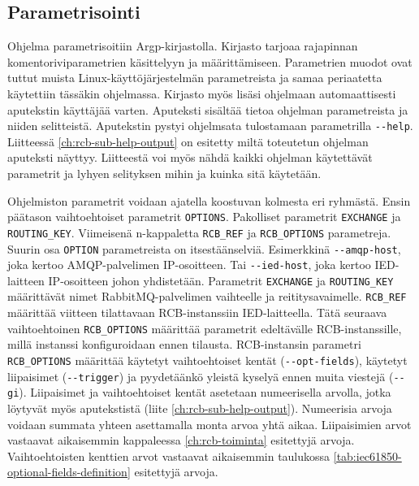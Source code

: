 \subsection{Parametrisointi}
Ohjelma parametrisoitiin Argp-kirjastolla. Kirjasto tarjoaa rajapinnan komentoriviparametrien käsittelyyn ja määrittämiseen. Parametrien muodot ovat tuttut muista Linux-käyttöjärjestelmän parametreista ja samaa periaatetta käytettiin tässäkin ohjelmassa. Kirjasto myös lisäsi ohjelmaan automaattisesti aputekstin käyttäjää varten. Aputeksti sisältää tietoa ohjelman parametreista ja niiden selitteistä. Aputekstin pystyi ohjelmsata tulostamaan parametrilla \texttt{-{}-help}. Liitteessä \ref{ch:rcb-sub-help-output} on esitetty miltä toteutetun ohjelman aputeksti näyttyy. Liitteestä voi myös nähdä kaikki ohjelman käytettävät parametrit ja lyhyen selityksen mihin ja kuinka sitä käytetään.

Ohjelmiston parametrit voidaan ajatella koostuvan kolmesta eri ryhmästä. Ensin päätason vaihtoehtoiset parametrit \texttt{OPTIONS}. Pakolliset parametrit \texttt{EXCHANGE} ja \texttt{ROUTING\_KEY}. Viimeisenä n-kappaletta \texttt{RCB\_REF} ja \texttt{RCB\_OPTIONS} parametreja. Suurin osa \texttt{OPTION} parametreista on itsestäänselviä. Esimerkkinä \texttt{-{}-amqp-host}, joka kertoo AMQP-palvelimen IP-osoitteen. Tai \texttt{-{}-ied-host}, joka kertoo IED-laitteen IP-osoitteen johon yhdistetään. Parametrit \texttt{EXCHANGE} ja \texttt{ROUTING\_KEY} määrittävät nimet RabbitMQ-palvelimen vaihteelle ja reititysavaimelle. \texttt{RCB\_REF} määrittää viitteen tilattavaan RCB-instanssiin IED-laitteella. Tätä seuraava vaihtoehtoinen \texttt{RCB\_OPTIONS} määrittää parametrit edeltävälle RCB-instanssille, millä instanssi konfiguroidaan ennen tilausta. RCB-instansin parametri \texttt{RCB\_OPTIONS} määrittää käytetyt vaihtoehtoiset kentät (\texttt{-{}-opt-fields}), käytetyt liipaisimet (\texttt{-{}-trigger}) ja pyydetäänkö yleistä kyselyä ennen muita viestejä (\texttt{-{}-gi}). Liipaisimet ja vaihtoehtoiset kentät asetetaan numeerisella arvolla, jotka löytyvät myös aputekstistä (liite \ref{ch:rcb-sub-help-output}). Numeerisia arvoja voidaan summata yhteen asettamalla monta arvoa yhtä aikaa. Liipaisimien arvot vastaavat aikaisemmin kappaleessa \ref{ch:rcb-toiminta} esitettyjä arvoja. Vaihtoehtoisten kenttien arvot vastaavat aikaisemmin taulukossa \ref{tab:iec61850-optional-fields-definition} esitettyjä arvoja.

